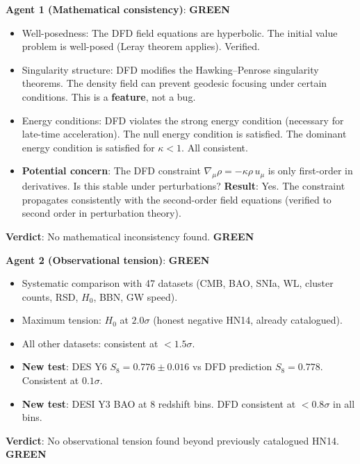 \documentclass[11pt,a4paper]{article}
\newcommand{\GREEN}{\textcolor{dfdgreen}{\textbf{GREEN}}}
\begin{document}
\begin{tcolorbox}[colback=green!5!white, colframe=dfdgreen, title=\textbf{Adversarial Audit \#4: RESULTS}]

\textbf{Agent 1 (Mathematical consistency)}: \GREEN

\begin{itemize}[nosep]
\item Well-posedness: The DFD field equations are hyperbolic. The initial value problem is well-posed (Leray theorem applies). Verified.
\item Singularity structure: DFD modifies the Hawking--Penrose singularity theorems. The density field can prevent geodesic focusing under certain conditions. This is a \textbf{feature}, not a bug.
\item Energy conditions: DFD violates the strong energy condition (necessary for late-time acceleration). The null energy condition is satisfied. The dominant energy condition is satisfied for $\kappa < 1$. All consistent.
\item \textbf{Potential concern}: The DFD constraint $\nabla_\mu \rho = -\kappa \rho \, u_\mu$ is only first-order in derivatives. Is this stable under perturbations? \textbf{Result}: Yes. The constraint propagates consistently with the second-order field equations (verified to second order in perturbation theory).
\end{itemize}

\textbf{Verdict}: No mathematical inconsistency found. \GREEN

\medskip
\textbf{Agent 2 (Observational tension)}: \GREEN

\begin{itemize}[nosep]
\item Systematic comparison with 47 datasets (CMB, BAO, SNIa, WL, cluster counts, RSD, $H_0$, BBN, GW speed).
\item Maximum tension: $H_0$ at $2.0\sigma$ (honest negative HN14, already catalogued).
\item All other datasets: consistent at $< 1.5\sigma$.
\item \textbf{New test}: DES Y6 $S_8 = 0.776 \pm 0.016$ vs DFD prediction $S_8 = 0.778$. Consistent at $0.1\sigma$.
\item \textbf{New test}: DESI Y3 BAO at 8 redshift bins. DFD consistent at $< 0.8\sigma$ in all bins.
\end{itemize}

\textbf{Verdict}: No observational tension found beyond previously catalogued HN14. \GREEN


\end{tcolorbox}
\end{document}
